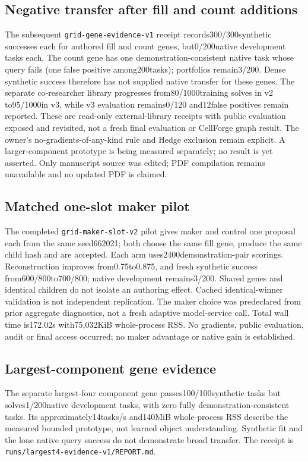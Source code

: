 \documentclass[11pt]{article}
\begin{document}
\subsection{Negative transfer after fill and count additions}
The subsequent \texttt{grid-gene-evidence-v1} receipt records300/300synthetic
successes each for authored fill and count genes, but0/200native development
tasks each. The count gene has one demonstration-consistent native task whose
query fails (one false positive among200tasks); portfolios remain3/200.
Dense synthetic success therefore has not supplied native transfer for these
genes. The separate co-researcher library progresses from80/1000training solves
in v2 to95/1000in v3, while v3 evaluation remains0/120 and12false positives
remain reported. These are read-only external-library receipts with public
evaluation exposed and revisited, not a fresh final evaluation or CellForge
graph result. The owner's no-gradients-of-any-kind rule and Hedge exclusion
remain explicit. A larger-component prototype is being measured separately;
no result is yet asserted. Only manuscript source was edited; PDF compilation
remains unavailable and no updated PDF is claimed.

\subsection{Matched one-slot maker pilot}
The completed \texttt{grid-maker-slot-v2} pilot gives maker and control one
proposal each from the same seed662021; both choose the same fill gene, produce
the same child hash and are accepted. Each arm uses2400demonstration-pair
scorings. Reconstruction improves from0.75to0.875, and fresh synthetic success
from600/800to700/800; native development remains3/200. Shared genes and identical
children do not isolate an authoring effect. Cached identical-winner validation
is not independent replication. The maker choice was predeclared from prior
aggregate diagnostics, not a fresh adaptive model-service call. Total wall time
is172.02s with75{,}032KiB whole-process RSS. No gradients, public evaluation,
audit or final access occurred; no maker advantage or native gain is established.

\subsection{Largest-component gene evidence}
The separate largest-four component gene passes100/100synthetic tasks but
solves1/200native development tasks, with zero fully demonstration-consistent
tasks. Its approximately14tasks/s and140MiB whole-process RSS describe the
measured bounded prototype, not learned object understanding. Synthetic fit
and the lone native query success do not demonstrate broad transfer.
The receipt is \texttt{runs/largest4-evidence-v1/REPORT.md}.
\end{document}
